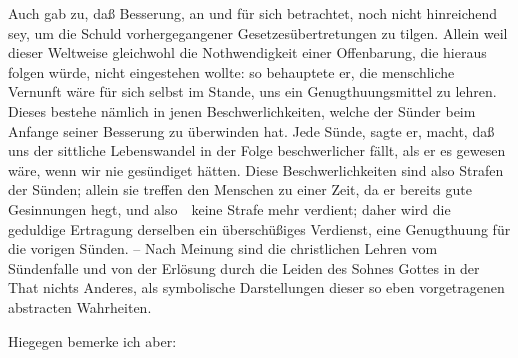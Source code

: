 \begin{aufza}
\begin{aufzb}
\begin{RWanm}
\end{RWanm}
\end{aufzb}
\item Auch  gab zu, daß Besserung, an und für sich betrachtet, noch nicht hinreichend sey, um die Schuld vorhergegangener Gesetzesübertretungen zu tilgen. Allein weil dieser Weltweise gleichwohl die Nothwendigkeit einer Offenbarung, die hieraus folgen würde, nicht eingestehen wollte: so behauptete er, die menschliche Vernunft wäre für sich selbst im Stande, uns ein Genugthuungsmittel zu lehren. Dieses bestehe nämlich in jenen Beschwerlichkeiten, welche der Sünder beim Anfange seiner Besserung zu überwinden hat. Jede Sünde, sagte er, macht, daß uns der sittliche Lebenswandel in der Folge beschwerlicher fällt, als er es gewesen wäre, wenn wir nie gesündiget hätten. Diese Beschwerlichkeiten sind also Strafen der Sünden; allein sie treffen den Menschen zu einer Zeit, da er bereits gute Gesinnungen hegt, und also~\ keine Strafe mehr verdient; daher wird die geduldige Ertragung derselben ein überschüßiges Verdienst, eine Genugthuung für die vorigen Sünden. -- Nach  Meinung sind die christlichen Lehren vom Sündenfalle und von der Erlösung durch die Leiden des Sohnes Gottes in der That nichts Anderes, als symbolische Darstellungen dieser so eben vorgetragenen abstracten Wahrheiten.
\end{aufza}\par
Hiegegen bemerke ich aber:
